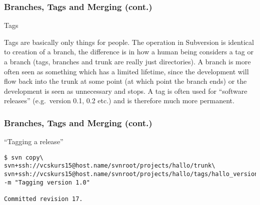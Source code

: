 \begin{frame}[fragile]
    \frametitle{Branches, Tags and Merging (cont.)}

    \begin{alertblock}{Tags}

        Tags are basically only things for people.  The operation in
        Subversion is identical to creation of a branch, the difference is
        in how a human being considers a tag or a branch (tags, branches and
        trunk are really just directories).  A branch is more often seen as
        something which has a limited lifetime, since the development will
        flow back into the trunk at some point (at which point the branch
        ends) or the development is seen as unnecessary and stops.  A tag is
        often used for \enquote{software releases} (e.g.~version 0.1, 0.2
        etc.) and is therefore much more permanent.

    \end{alertblock}
\end{frame}

\begin{frame}[fragile]
    \frametitle{Branches, Tags and Merging (cont.)}
    \linuxframe

    \begin{alertblock}{\enquote{Tagging a release}}
\begin{lstlisting}[basicstyle=\tiny\ttfamily\color{black}]
$ svn copy\
svn+ssh://vcskurs15@host.name/svnroot/projects/hallo/trunk\
svn+ssh://vcskurs15@host.name/svnroot/projects/hallo/tags/hallo_version_1.0\
-m "Tagging version 1.0"

Committed revision 17.
\end{lstlisting}
    \end{alertblock}

\end{frame}

